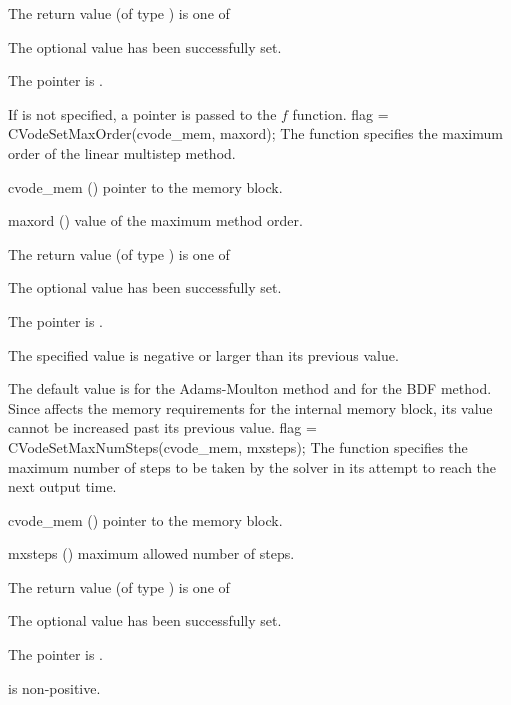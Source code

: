 {
  The return value  (of type ) is one of
  \begin{args}
  \item[\Id{CV\_SUCCESS}] 
    The optional value has been successfully set.
  \item[\Id{CV\_MEM\_NULL}]
    The  pointer is .
  \end{args}
}
{
  If  is not specified, a  pointer is
  passed to the $f$ function.
}
{
flag = CVodeSetMaxOrder(cvode\_mem, maxord);
}
{
  The function  specifies the maximum order of the 
  linear multistep method.
}
{
  \begin{args}
  \item[cvode\_mem] ()
    pointer to the {\cvodes} memory block.
  \item[maxord] ()
    value of the maximum method order.
  \end{args}
}
{
  The return value  (of type ) is one of
  \begin{args}
  \item[\Id{CV\_SUCCESS}] 
    The optional value has been successfully set.
  \item[\Id{CV\_MEM\_NULL}]
    The  pointer is .
  \item[\Id{CV\_ILL\_INPUT}]
    The specified value  is negative or larger than 
    its previous value.
  \end{args}
}
{
  The default value is  for
  the Adams-Moulton method and 
  for the BDF method.
  Since  affects the memory requirements
  for the internal {\cvodes} memory block, its value
  cannot be increased past its previous value.
}
{
flag = CVodeSetMaxNumSteps(cvode\_mem, mxsteps);
}
{
  The function  specifies the maximum number
  of steps to be taken by the solver in its attempt to reach 
  the next output time.
}
{
  \begin{args}
  \item[cvode\_mem] ()
    pointer to the {\cvodes} memory block.
  \item[mxsteps] ()
    maximum allowed number of steps.
  \end{args}
}
{
  The return value  (of type ) is one of
  \begin{args}
  \item[\Id{CV\_SUCCESS}] 
    The optional value has been successfully set.
  \item[\Id{CV\_MEM\_NULL}]
    The  pointer is .
  \item[\Id{CV\_ILL\_INPUT}]
     is non-positive.
  \end{args}
}
